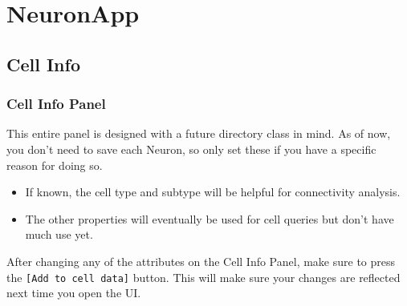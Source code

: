 \documentclass[11pt]{beamer}
\begin{document}
\section{NeuronApp}
\subsection{Cell Info}
	\begin{frame}
		\frametitle{Cell Info Panel}
		This entire panel is designed with a future directory class in mind. As of now, you don't need to save each Neuron, so only set these if you have a specific reason for doing so.
		\begin{itemize}
			\item If known, the cell type and subtype will be helpful for connectivity analysis.
			\item The other properties will eventually be used for cell queries but don't have much use yet.
		\end{itemize}
			After changing any of the attributes on the Cell Info Panel, make sure to press the \texttt{[Add to cell data]} button. This will make sure your changes are reflected next time you open the UI.\\
	\end{frame}
\end{document}

